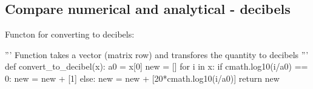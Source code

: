 \documentclass[a4paper, 16pt]{article}
\begin{document}
\subsection{Compare numerical and analytical - decibels}

Functon for converting to decibels:
\begin{python}
''' Function takes a vector (matrix row) and transfores the quantity to decibels '''
def convert_to_decibel(x):
    a0 = x[0]
    new = []
    for i in x:
        if cmath.log10(i/a0) == 0:
            new = new + [1]
        else:
            new = new +  [20*cmath.log10(i/a0)]
    return new
\end{python}


\begin{figure}[H]
 \\

\end{figure}
\end{document}
